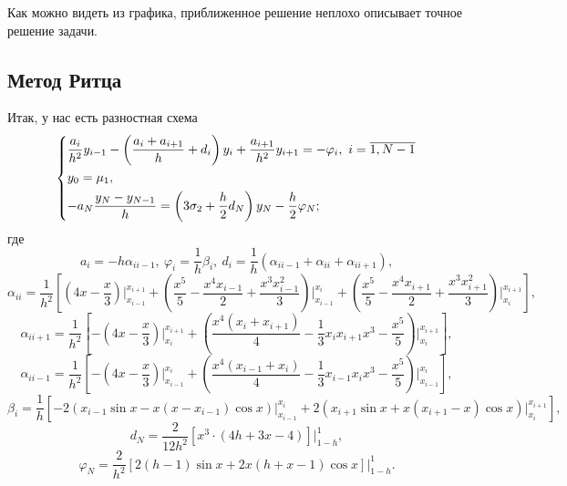\documentclass[a4paper, 12pt]{article}
\begin{document}
    Как можно видеть из графика, приближенное решение неплохо описывает
точное решение задачи.

    \hypertarget{ux43cux435ux442ux43eux434-ux440ux438ux442ux446ux430}{%
\subsection{Метод
Ритца}\label{ux43cux435ux442ux43eux434-ux440ux438ux442ux446ux430}}

    Итак, у нас есть разностная схема \[\begin{dcases}
            \dfrac{a_i}{h^2}y_{i-1} - \left(\dfrac{a_i +a_{i+1}}{h}+d_i\right)y_i + \dfrac{a_{i+1}}{h^2}y_{i+1} = -\varphi_i,\ i=\overline {1,N-1}\\
            y_0 = \mu_1,\\
            -a_N \dfrac{y_N - y_{N-1}}{h} = \left(3\sigma_2 + \dfrac h2 d_N\right)y_N - \dfrac h2 \varphi_N;
        \end{dcases}
        \] где
\[a_i = -h\alpha_{ii-1},\ \varphi_i = \dfrac 1 h \beta_i,\ d_i = \dfrac 1h(\alpha_{ii-1} +\alpha_{ii} + \alpha_{ii+1}),\]
\[\alpha_{ii} = \dfrac {1}{h^2}\left[ \left(4 x- \dfrac{x}{3}\right) \Big|_{x_{i-1}}^{x_{i+1}} + \left(\dfrac{x^5}{5} - \dfrac{x^4 x_{i-1}}{2} + \dfrac{x^3 x_{i-1}^2}{3}\right)\Big|_{x_{i-1}}^{x_i} + \left(\dfrac{x^5}{5} - \dfrac{x^4 x_{i+1}}{2} + \dfrac{x^3 x_{i+1}^2}{3}\right)\Big|_{x_{i}}^{x_{i+1}}\right],\]
\[\alpha_{ii+1} = \dfrac{1}{h^2}\left[-\left(4 x- \dfrac{x}{3}\right) \Big|_{x_{i}}^{x_{i+1}} + \left(\dfrac{x^4(x_i + x_{i+1})}{4}-\dfrac 1 3 x_i x_{i+1}x^3 - \dfrac{x^5}{5}\right)\Big|_{x_{i}}^{x_{i+1}}\right],\]
\[\alpha_{ii-1} = \dfrac{1}{h^2}\left[-\left(4 x- \dfrac{x}{3}\right) \Big|_{x_{i-1}}^{x_{i}} + \left(\dfrac{x^4(x_{i-1} + x_{i})}{4}-\dfrac 1 3 x_{i-1} x_{i}x^3 - \dfrac{x^5}{5}\right)\Big|_{x_{i-1}}^{x_{i}}\right],\]
\[\beta_i = \dfrac 1 h \left[-2(x_{i-1}\sin x - x (x - x_{i-1})\cos x)\Big|_{x_{i-1}}^{x_i} + 2(x_{i+1}\sin x + x (x_{i+1} - x)\cos x)\Big|_{x_{i}}^{x_{i+1}}\right],\]
\[ d_N = \dfrac{2}{12h^2}\left[x^3\cdot (4h+3x-4) \right]\Big|_{1-h}^{1},\]
\[\varphi_N = \dfrac{2}{h^2} \left[2(h-1)\sin x + 2x(h+x-1)\cos x\right]\Big|_{1-h}^{1}.\]
\end{document}
